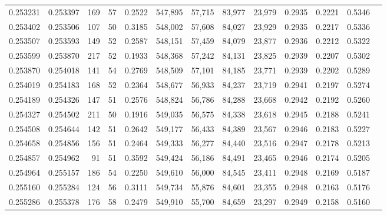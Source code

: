 \begin{tabular}{rrrrrrrrrrrrr}
0.253231 & 0.253397 &   169 &  57 &                                     0.2522 & 547,895 &  57,715 &  83,977 &  23,979 & 0.2935 & 0.2221 & 0.5346 \\
0.253402 & 0.253506 &   107 &  50 &                                     0.3185 & 548,002 &  57,608 &  84,027 &  23,929 & 0.2935 & 0.2217 & 0.5336 \\
0.253507 & 0.253593 &   149 &  52 &                                     0.2587 & 548,151 &  57,459 &  84,079 &  23,877 & 0.2936 & 0.2212 & 0.5322 \\
0.253599 & 0.253870 &   217 &  52 &                                     0.1933 & 548,368 &  57,242 &  84,131 &  23,825 & 0.2939 & 0.2207 & 0.5302 \\
0.253870 & 0.254018 &   141 &  54 &                                     0.2769 & 548,509 &  57,101 &  84,185 &  23,771 & 0.2939 & 0.2202 & 0.5289 \\
0.254019 & 0.254183 &   168 &  52 &                                     0.2364 & 548,677 &  56,933 &  84,237 &  23,719 & 0.2941 & 0.2197 & 0.5274 \\
0.254189 & 0.254326 &   147 &  51 &                                     0.2576 & 548,824 &  56,786 &  84,288 &  23,668 & 0.2942 & 0.2192 & 0.5260 \\
0.254327 & 0.254502 &   211 &  50 &                                     0.1916 & 549,035 &  56,575 &  84,338 &  23,618 & 0.2945 & 0.2188 & 0.5241 \\
0.254508 & 0.254644 &   142 &  51 &                                     0.2642 & 549,177 &  56,433 &  84,389 &  23,567 & 0.2946 & 0.2183 & 0.5227 \\
0.254658 & 0.254856 &   156 &  51 &                                     0.2464 & 549,333 &  56,277 &  84,440 &  23,516 & 0.2947 & 0.2178 & 0.5213 \\
0.254857 & 0.254962 &    91 &  51 &                                     0.3592 & 549,424 &  56,186 &  84,491 &  23,465 & 0.2946 & 0.2174 & 0.5205 \\
0.254964 & 0.255157 &   186 &  54 &                                     0.2250 & 549,610 &  56,000 &  84,545 &  23,411 & 0.2948 & 0.2169 & 0.5187 \\
0.255160 & 0.255284 &   124 &  56 &                                     0.3111 & 549,734 &  55,876 &  84,601 &  23,355 & 0.2948 & 0.2163 & 0.5176 \\
0.255286 & 0.255378 &   176 &  58 &                                     0.2479 & 549,910 &  55,700 &  84,659 &  23,297 & 0.2949 & 0.2158 & 0.5160 \\

\end{tabular}
